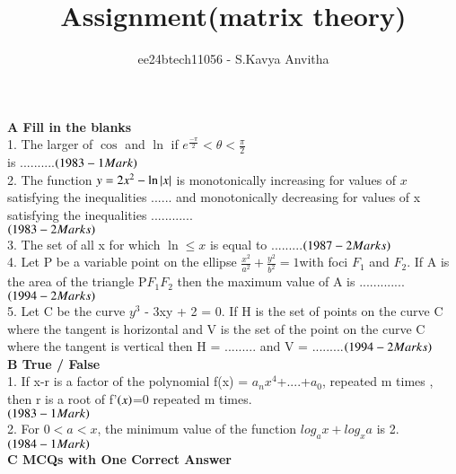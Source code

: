\documentclass[journal,12pt,twocolumn]{IEEEtran}
\theoremstyle{remark}
\begin{document}

\vspace{3cm}

\title{Assignment(matrix theory)}
\author{ee24btech11056 - S.Kavya Anvitha}
\maketitle
\textbf{A Fill in the blanks}\\
1.  The larger of $\cos $\brak{\ln \theta}$ $ and  $\ln $\brak{\cos \theta}$ $ if
$e^{\frac{-\pi}{2}}< \theta< \frac{\pi}{2}$\\
\indent is ..........\hfill$\left(1983 - 1 Mark\right)$\\
 2.  The function $y=2x^{2}-\ln \left\vert x\right\vert$ is monotonically \indent increasing
 for values of $x$$ $ satisfying the \indent inequalities ...... and
 monotonically decreasing for \indent values of x satisfying the inequalities 
 ............\\ \indent\hfill$\left(1983 - 2 Marks\right)$\\
3.  The set of all x for which $\ln $$ \leq x$ is equal \indent
to .........\hfill$\left(1987 - 2 Marks\right)$\\
4.  Let P be a variable point on the ellipse
$\frac{x^2}{a^2}+\frac{y^2}{b^2} = 1$\indent with foci 
$F_1$ and $F_2$. If A is the area of the \indent triangle 
P$F_1$$F_2$ then the maximum value of A is \hspace{5cm}\indent............. 
\hfill$\left(1994 - 2 Marks\right)$\\
5.  Let C be the curve $y^3$ - 3xy + 2 = 0. If H is the \indent set of
points on the curve C where the tangent \indent is horizontal and V is
the set of the point on the \indent curve C where the tangent is vertical
then H = \indent ......... and V = .........\hfill$\left(1994 - 2 Marks\right)$\\
\indent\hspace{0.3cm}\textbf{B True / False}\\
1. If x-r is a factor of the polynomial f(x) = \indent $a_n$$x^4$+....+$a_0$,
repeated m times $ $$ $, then \indent r is a root of f'$\left(x\right)$=0 
repeated m times.\\
\indent \hfill$\left(1983 - 1 Mark\right)$\\
2.  For $0 < a < x$, the minimum value of the function \indent 
$log_a x + log_x a$ is 2. \hfill$\left(1984 - 1 Mark\right)$\\
\indent\hspace{0.3cm}\textbf{C MCQs with One Correct Answer}\\
\end{document}
